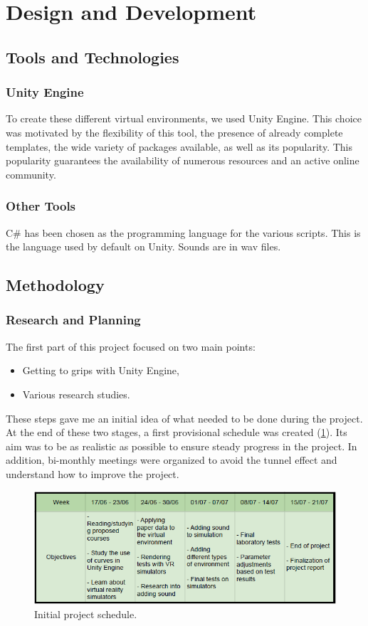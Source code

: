 \documentclass[american]{acmtog} %
\begin{document}
\section{Design and Development}
\label{sec:design}
\subsection{Tools and Technologies}
\subsubsection{Unity Engine}
To create these different virtual environments, we used Unity Engine. This choice was motivated by the flexibility of this tool, the presence of already complete templates, the wide variety of packages available, as well as its popularity. This popularity guarantees the availability of numerous resources and an active online community.

\subsubsection{Other Tools}
C\# has been chosen as the programming language for the various scripts. This is the language used by default on Unity. Sounds are in wav files.

\subsection{Methodology}

\subsubsection{Research and Planning}
The first part of this project focused on two main points:
\begin{itemize}[label=\textbullet]
    \item Getting to grips with Unity Engine,
    \item Various research studies.
\end{itemize}
These steps gave me an initial idea of what needed to be done during the project. At the end of these two stages, a first provisional schedule was created (\ref{fig:planning}). Its aim was to be as realistic as possible to ensure steady progress in the project. In addition, bi-monthly meetings were organized to avoid the tunnel effect and understand how to improve the project.

\begin{figure}
\centerline{\includegraphics[width=\columnwidth]{figures/Planning.png}}
\caption{Initial project schedule.}
    \label{fig:planning}
\end{figure}
\end{document}
